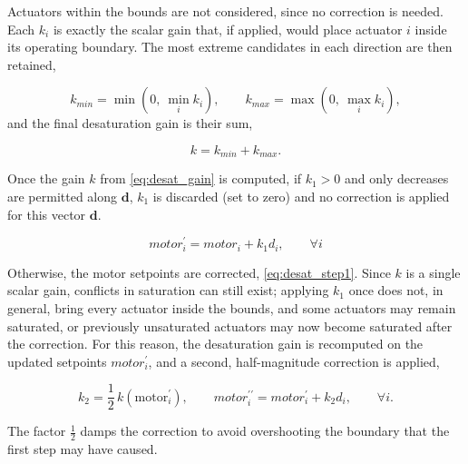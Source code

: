 Actuators within the bounds are not considered, since no correction is needed.
Each $k_i$ is exactly the scalar gain that, if applied, would place actuator $i$ inside its operating boundary. 
The most extreme candidates in each direction are then retained,

\begin{equation}
  k_{min} = \min\left(0,\ \min_i k_i\right), \qquad
  k_{max} = \max\left(0,\ \max_i k_i\right),
  \label{eq:desat_extremes}
\end{equation}
and the final desaturation gain is their sum,

\begin{equation}
  k = k_{min} + k_{max}.
  \label{eq:desat_gain}
\end{equation}

Once the gain $k$ from \autoref{eq:desat_gain} is computed, if $k_1 > 0$ and only decreases are permitted along $\mathbf{d}$, $k_1$ is discarded (set to zero) and no correction is applied for this vector $\mathbf{d}$.


\begin{equation}
  motor_i^\prime = motor_i + k_1 d_i, \qquad \forall i
  \label{eq:desat_step1}
\end{equation}

Otherwise, the motor setpoints are corrected, \eqref{eq:desat_step1}. 
Since $k$ is a single scalar gain, conflicts in saturation can still exist; applying $k_1$ once does not, in general, bring every actuator inside the bounds, and some actuators may remain saturated, or previously unsaturated actuators may now become saturated after the correction. 
For this reason, the desaturation gain is recomputed on the updated setpoints $motor_i^\prime$, and a second, half-magnitude correction is applied,

\begin{equation}
  k_2 = \dfrac{1}{2}\,k(\text{motor}_i^{\prime}), \qquad
  motor_i^{\prime\prime} = motor_i^\prime + k_2 d_i, \qquad \forall i.
  \label{eq:desat_step2}
\end{equation}

The factor $\tfrac{1}{2}$ damps the correction to avoid overshooting the boundary that the first step may have caused.

